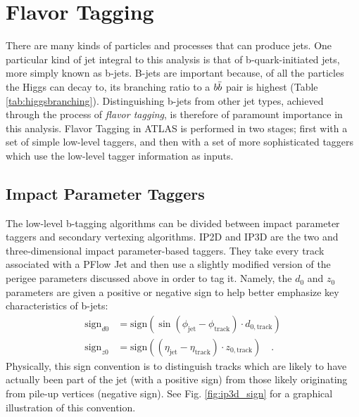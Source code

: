
    \FloatBarrier
    \section{Flavor Tagging}
        
        There are many kinds of particles and processes that can produce jets.
        One particular kind of jet integral to this analysis is that of b-quark-initiated jets,
            more simply known as b-jets.
        B-jets are important because, of all the particles the Higgs can decay to,
            its branching ratio to a $b \bar{b}$ pair is highest (Table \ref{tab:higgsbranching}).
        Distinguishing b-jets from other jet types,
            achieved through the process of \textit{flavor tagging},
            is therefore of paramount importance in this analysis.
        Flavor Tagging in ATLAS is performed in two stages;
            first with a set of simple low-level taggers,
            and then with a set of more sophisticated taggers which use the low-level tagger information as inputs.


        \FloatBarrier
        \subsection{Impact Parameter Taggers}

            The low-level b-tagging algorithms can be divided between impact parameter taggers and secondary vertexing algorithms.
            IP2D and IP3D are the two and three-dimensional impact parameter-based taggers.
            They take every track associated with a PFlow Jet
                and then use a slightly modified version of the perigee parameters discussed above in order to tag it.
            Namely, the $d_0$ and $z_0$ parameters are given a positive or negative sign to help better emphasize key characteristics of b-jets\cite{thesis_giacinto}:
            \begin{equation} \begin{split}
                \textrm{sign}_{d0} &= \textrm{sign}(\sin(\phi_{\textrm{jet}} - \phi_{\textrm{track}}) \cdot d_{0,\textrm{track}}) \\
                \textrm{sign}_{z0} &= \textrm{sign}((\eta_{\textrm{jet}} - \eta_{\textrm{track}}) \cdot z_{0,\textrm{track}})
                \quad.
            \end{split} \end{equation}
            Physically, this sign convention is to distinguish tracks which are likely to have actually been part of the jet (with a positive sign)
                from those likely originating from pile-up vertices (negative sign).
            See Fig. \ref{fig:ip3d_sign} for a graphical illustration of this convention.

